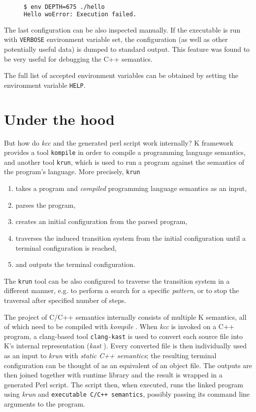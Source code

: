 \documentclass{fithesis3}
\newcommand{\kcc}{\textit{kcc} }
\newcommand{\kast}{\textit{kast} }
\newcommand{\krun}{\textit{krun} }
\newcommand{\kompile}{\textit{kompile} }
\begin{document}
\begin{figure}[h]
\begin{lstlisting}[language=bash, basicstyle=\footnotesize\ttfamily]
$ env DEPTH=675 ./hello
Hello woError: Execution failed.
\end{lstlisting}
\end{figure}

The last configuration can be also inspected manually. If the executable is run with \texttt{VERBOSE} environment variable set, the configuration (as well as other potentially useful data) is dumped to standard output. This feature was found to be very useful for debugging the C++ semantics.

The full list of accepted environment variables can be obtained by setting the environment variable \texttt{HELP}.


\section{Under the hood}

But how do \kcc and the generated perl script work internally? K framework provides a tool \texttt{kompile} in order to compile a programming language semantics, and another tool \texttt{krun}, which is used to run a program against the semantics of the program's language. More precisely, \texttt{krun} 
\begin{enumerate}
\item takes a program and \textit{compiled} programming language semantics as an input,
\item parses the program,
\item creates an initial configuration from the parsed program,
\item traverses the induced transition system from the initial configuration until a terminal configuration is reached,
\item and outputs the terminal configuration.
\end{enumerate}
The \texttt{krun} tool can be also configured to traverse the transition system in a different manner, e.g. to perform a search for a specific \textit{pattern}, or to stop the traversal after specified number of steps.

The project of C/C++ semantics internally consists of multiple K semantics, all of which need to be compiled with \kompile. When \kcc is invoked on a C++ program, a clang-based tool \texttt{clang-kast} is used to convert each source file into K's internal representation (\kast). Every converted file is then individually used as an input to \krun with \textit{static C++ semantics}; the resulting terminal configuration can be thought of as an equivalent of an object file. The outputs are then joined together with runtime library and the result is wrapped in a generated Perl script. The script then, when executed, runs the linked program using \krun and \texttt{executable C/C++ semantics}, possibly passing its command line arguments to the program.
\end{document}
